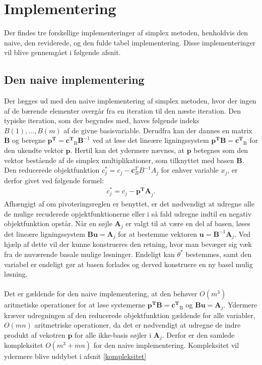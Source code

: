%
\section{Implementering}
Der findes tre forskellige implementeringer af simplex metoden, henholdvis den naive, den reviderede, og den fulde tabel implementering. Disse implementeringer vil blive gennemgået i følgende afsnit. 

\subsection{Den naive implementering}
Der lægges ud med den naive implementering af simplex metoden, hvor der ingen af de bærende elementer overgår fra en iteration til den næste iteration. Den typiske iteration, som der begyndes med, haves følgende indeks $B(1),\ldots,B(m)$ af de givne basisvariable. Derudfra kan der dannes en matrix $\mathbf{B}$ og beregne $\mathbf{p^T}=\mathbf{c^T}_{\text{B}}\mathbf{B}^{-1}$ ved at løse det lineære ligningssystem $\mathbf{p^T}\mathbf{B}=\mathbf{c^T}_{\text{B}}$ for den ukendte vektor $\mathbf{p}$. Hertil kan det ydermere nævnes, at $\mathbf{p}$ betegnes som den vektor bestående af de simplex multiplikationer, som tilknyttet med basen $\mathbf{B}$. Den reducerede objektfunktion $c_j^* = c_j - \mathbf{c}_B^T B^{-1}A_j$ for enhver variable $x_j$, er derfor givet ved følgende formel:
%
\begin{align*}
c_j^* = c_j - \mathbf{p^{T}A}_j.
\end{align*}
%
Afhængigt af om pivoteringsreglen er benyttet, er det nødvendigt at udregne alle de mulige recuderede opjektfunktionerne eller i så fald udregne indtil en negativ objektfunktion opstår. Når en søjle $\mathbf{A}_j$ er valgt til at være en del af basen, løses det lineære ligningssystem $\mathbf{Bu}=\mathbf{A}_j$ for at bestemme vektoren $\mathbf{u}=\mathbf{B}^{-1}\mathbf{A}_j$. Ved hjælp af dette vil der kunne konstrueres den retning, hvor man bevæger sig væk fra de nuværende basale mulige løsninger. Endeligt kan $\theta^*$ bestemmes, samt den variabel er endeligt gør at basen forlades og derved konstruere en ny basel mulig løsning. \\\\
Det er gældende for den naive implementering, at den behøver $O(m^3)$ aritmetiske operationer for at løse systemerne $\mathbf{p^T}\mathbf{B}=\mathbf{c^T}_{\text{B}}$ og $\mathbf{Bu}=\mathbf{A}_j$. Ydermere kræver udregningen af den reducerede objektfunktion gældende for alle variabler, $O(mn)$ aritmetriske operationer, da det er nødvendigt at udregne de indre produkt af vekotren $\mathbf{p}$ for alle ikke-basis søjler i $\mathbf{A}_j$. Derfor er den samlede kompleksitet $O(m^3+mn)$ for den naive implementering. Kompleksitet vil ydermere blive uddybet i afsnit \ref{kompleksitet}
